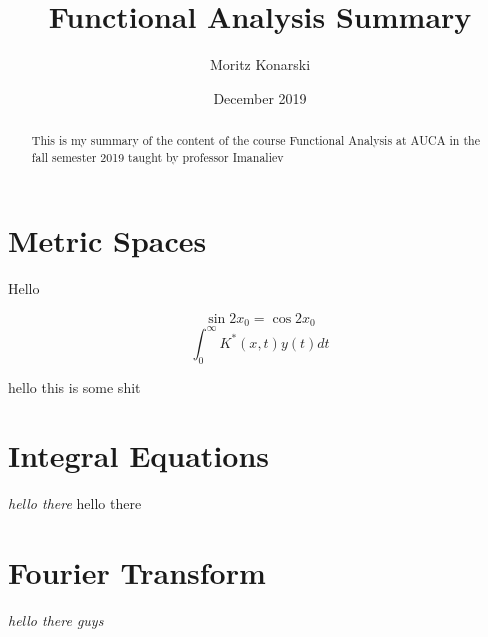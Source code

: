 \documentclass[12pt,a4paper,draft]{article}
\begin{document}
\title{Functional Analysis Summary}
\author{Moritz Konarski}
\date{December 2019}
\maketitle

\renewcommand{\abstractname}{Information}

\begin{abstract}
    This is my summary of the content of the course Functional Analysis at AUCA
    in the fall semester 2019 taught by professor Imanaliev
\end{abstract}

\tableofcontents

\section{Metric Spaces}
Hello

$$ \sin{2x_0} = \cos{2x_0} $$
$$ \int_{0}^{\infty}{K^{*}(x,t)y(t)dt} $$

hello this is some shit

\section{Integral Equations}
{\em hello there} hello there

\section{Fourier Transform}
\emph{hello there guys}
\end{document}
